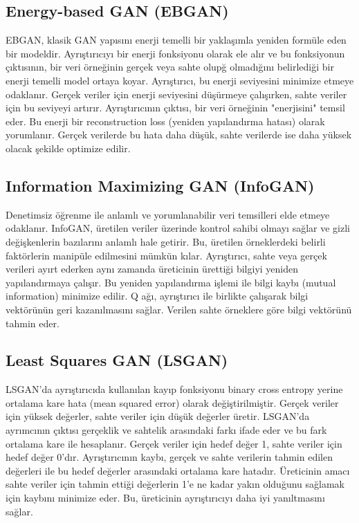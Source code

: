 \subsection{Energy-based GAN (EBGAN)}

EBGAN, klasik GAN yapısını enerji temelli bir yaklaşımla yeniden formüle eden bir modeldir. Ayrıştırıcıyı bir enerji fonksiyonu olarak ele alır ve bu fonksiyonun çıktısının, bir veri örneğinin gerçek veya sahte olupğ olmadığını belirlediği bir enerji temelli model ortaya koyar. Ayrıştırıcı, bu enerji seviyesini minimize etmeye odaklanır. Gerçek veriler için enerji seviyesini düşürmeye çalışırken, sahte veriler için bu seviyeyi artırır. Ayrıştırıcının çıktısı, bir veri örneğinin "enerjisini" temsil eder. Bu enerji bir reconstruction loss (yeniden yapılandırma hatası) olarak yorumlanır. Gerçek verilerde bu hata daha düşük, sahte verilerde ise daha yüksek olacak şekilde optimize edilir.

\subsection{Information Maximizing GAN (InfoGAN)}

Denetimsiz öğrenme ile anlamlı ve yorumlanabilir veri temsilleri elde etmeye odaklanır. InfoGAN, üretilen veriler üzerinde kontrol sahibi olmayı sağlar ve gizli değişkenlerin bazılarını anlamlı hale getirir. Bu, üretilen örneklerdeki belirli faktörlerin manipüle edilmesini mümkün kılar. Ayrıştırıcı, sahte veya gerçek verileri ayırt ederken aynı zamanda üreticinin ürettiği bilgiyi yeniden yapılandırmaya çalışır. Bu yeniden yapılandırma işlemi ile bilgi kaybı (mutual information) minimize edilir. Q ağı, ayrıştırıcı ile birlikte çalışarak bilgi vektörünün geri kazanılmasını sağlar. Verilen sahte örneklere göre bilgi vektörünü tahmin eder. 

\subsection{Least Squares GAN (LSGAN)}

LSGAN'da ayrıştırıcıda kullanılan kayıp fonksiyonu binary cross entropy yerine ortalama kare hata (mean squared error) olarak değiştirilmiştir. Gerçek veriler için yüksek değerler, sahte veriler için düşük değerler üretir. LSGAN'da ayrımcının çıktısı gerçeklik ve sahtelik arasındaki farkı ifade eder ve bu fark ortalama kare ile hesaplanır. Gerçek veriler için hedef değer 1, sahte veriler için hedef değer 0'dır. Ayrıştırıcının kaybı, gerçek ve sahte verilerin tahmin edilen değerleri ile bu hedef değerler arasındaki ortalama kare hatadır. Üreticinin amacı sahte veriler için tahmin ettiği değerlerin 1'e ne kadar yakın olduğunu sağlamak için kaybını minimize eder. Bu, üreticinin ayrıştırıcıyı daha iyi yanıltmasını sağlar.

